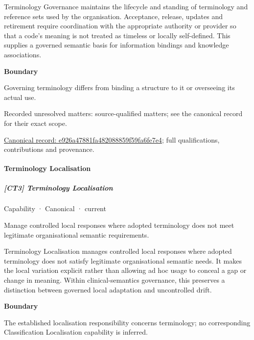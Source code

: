 Terminology Governance maintains the lifecycle and standing of terminology and reference sets used by the organisation. Acceptance, release, updates and retirement require coordination with the appropriate authority or provider so that a code's meaning is not treated as timeless or locally self-defined. This supplies a governed semantic basis for information bindings and knowledge associations.



\textbf{Boundary}



Governing terminology differs from binding a structure to it or overseeing its actual use.


{\small Recorded unresolved matters: source-qualified matters; see the canonical record for their exact scope.}\par
{\footnotesize \href{../../../../continuum/strategy/capability/e926a47881fa482088859f59fa6fe7e4.md}{Canonical record: e926a47881fa482088859f59fa6fe7e4}; full qualifications, contributions and provenance.}\par
\paragraph{Terminology Localisation}

\subparagraph{[CT3] Terminology Localisation}

\label{element:3aa80e1d84ea4e009b149c4f9a23f0f8}
{\small Capability · Canonical · current}\par

Manage controlled local responses where adopted terminology does not meet legitimate organisational semantic requirements.



Terminology Localisation manages controlled local responses where adopted terminology does not satisfy legitimate organisational semantic needs. It makes the local variation explicit rather than allowing ad hoc usage to conceal a gap or change in meaning. Within clinical-semantics governance, this preserves a distinction between governed local adaptation and uncontrolled drift.



\textbf{Boundary}



The established localisation responsibility concerns terminology; no corresponding Classification Localisation capability is inferred.


